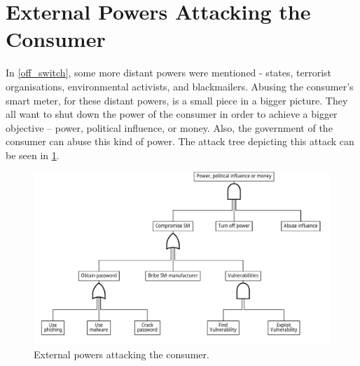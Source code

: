 
\section{External Powers Attacking the Consumer}
In \cref{off_switch}, some more distant powers were mentioned - states, terrorist organisations, environmental activists, and blackmailers.
Abusing the consumer's smart meter, for these distant powers, is a small piece in a bigger picture.
They all want to shut down the power of the consumer in order to achieve a bigger objective -- power, political influence, or money.
Also, the government of the consumer can abuse this kind of power.
The attack tree depicting this attack can be seen in \cref{fig:attack_trees:external}.

\begin{figure}[H]
  \centering
	\includegraphics[width=\textwidth]{figures/graphviz/offswitch.pdf}
	\caption{External powers attacking the consumer.}
	\label{fig:attack_trees:external}
\end{figure}

